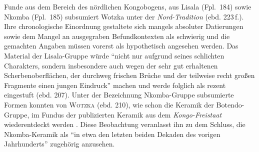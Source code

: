 Funde aus dem Bereich des nördlichen Kongobogens, aus Lisala (Fpl.~184) sowie Nkomba (Fpl.~185) subsumiert Wotzka unter der \textit{Nord-Tradition} (ebd. 223\,f.). Ihre chronologische Einordnung gestaltete sich mangels absoluter Datierungen sowie dem Mangel an ausgegraben Befundkontexten als schwierig und die gemachten Angaben müssen vorerst als hypothetisch angesehen werden. Das Material der Lisala-Gruppe würde \enquote{nicht nur aufgrund seines schlichten Charakters, sondern insbesondere auch wegen der sehr gut erhaltenen Scherbenoberflächen, der durchweg frischen Brüche und der teilweise recht großen Fragmente einen jungen Eindruck} machen und werde folglich als rezent eingestuft (ebd. 207). Unter der Bezeichnung Nkomba-Gruppe subsumierte Formen konnten von \textsc{Wotzka} (ebd. 210), wie schon die Keramik der Botendo-Gruppe, im Fundus der publizierten Keramik aus dem \textit{Kongo-Freistaat} wiederentdeckt werden \parencite[189--191 Taf.~13]{Coart.1907}. Diese Beobachtung veranlasst ihn zu dem Schluss, die Nkomba-Keramik als \enquote{in etwa den letzten beiden Dekaden des vorigen Jahrhunderts} \parencite[210]{Wotzka.1995} zugehörig anzusehen.

